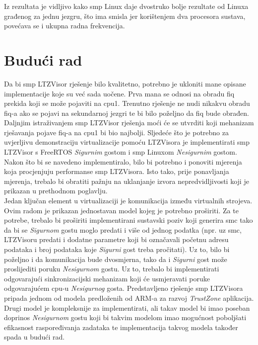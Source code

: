 \documentclass[times, utf8, diplomski, numeric]{fer}
\begin{document}
Iz rezultata je vidljivo kako \gls{smp} Linux daje dvostruko bolje rezultate od Linuxa građenog za jednu jezgru, što ima smisla
jer korištenjem dva procesora sustava, povećava se i ukupna radna frekvencija.

\chapter{Budući rad}
Da bi \gls{smp} LTZVisor rješenje bilo kvalitetno, potrebno je ukloniti mane opisane implementacije koje su već sada uočene.
Prva mana se odnosi na obradu \gls{fiq} prekida koji se može pojaviti na \gls{cpu}1. Trenutno rješenje ne nudi nikakvu obradu \gls{fiq}-a
ako se pojavi na sekundarnoj jezgri te bi bilo poželjno da \gls{fiq} bude obrađen. Daljnjim istraživanjem \gls{smp} LTZVisor
rješenja moći će se utvrditi koji mehanizam rješavanja pojave \gls{fiq}-a na \gls{cpu}1 bi bio najbolji. Sljedeće što je potrebno
za uvjerljivu demonstraciju virtualizacije pomoću LTZVisora je implementirati \gls{smp} LTZVisor s FreeRTOS
\textit{Sigurnim} gostom i \gls{smp} Linuxom \textit{Nesigurnim} gostom. Nakon što bi se navedeno implementiralo, bilo bi
potrebno i ponoviti mjerenja koja procjenjuju performanse \gls{smp} LTZVisora. Isto tako, prije ponavljanja mjerenja, trebalo
bi obratiti pažnju na uklanjanje izvora nepredvidljivosti koji je prikazan u prethodnom poglavlju. \\
Jedan ključan element
u virtualizaciji je komunikacija između virtualnih strojeva. Ovim radom je prikazan jednostavan model kojeg je potrebno
proširiti. Za te potrebe, trebalo bi proširiti implementirani sustavski poziv koji generira \gls{smc} tako da bi se
\textit{Sigurnom} gostu moglo predati i više od jednog podatka (npr. uz \gls{smc}, LTZVisoru predati i dodatne parametre koji
bi označavali početnu adresu podataka i broj podataka koje \textit{Sigurni} gost treba pročitati). Uz to, bilo bi poželjno
i da komunikacija bude dvosmjerna, tako da i \textit{Sigurni} gost može proslijediti poruku \textit{Nesigurnom} gostu.
Uz to, trebalo bi implementirati odgovarajući sinkronizacijski mehanizam koji će usmjeravati poruke odgovarajućem \gls{cpu}-u
\textit{Nesigurnog} gosta.
Predstavljeno rješenje \gls{smp} LTZVisora pripada jednom od modela predloženih od ARM-a za razvoj \textit{TrustZone} aplikacija.
Drugi model je kompleksnije za implementirati, ali takav model bi imao poseban doprinos \textit{Nesigurnom} gostu koji
bi takvim modelom imao mogućnost poboljšati efikasnost raspoređivanja zadataka te implementacija takvog modela također
spada u budući rad.
\end{document}
